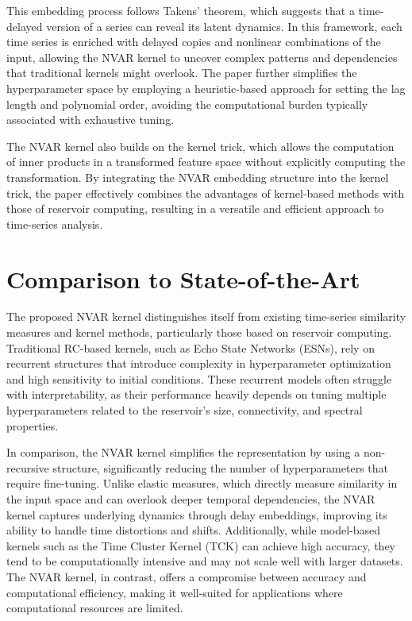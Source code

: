 This embedding process follows Takens’ theorem, which suggests that a time-delayed version of a series can reveal its latent dynamics. In this framework, each time series is enriched with delayed copies and nonlinear combinations of the input, allowing the NVAR kernel to uncover complex patterns and dependencies that traditional kernels might overlook. The paper further simplifies the hyperparameter space by employing a heuristic-based approach for setting the lag length and polynomial order, avoiding the computational burden typically associated with exhaustive tuning.

The NVAR kernel also builds on the kernel trick, which allows the computation of inner products in a transformed feature space without explicitly computing the transformation. By integrating the NVAR embedding structure into the kernel trick, the paper effectively combines the advantages of kernel-based methods with those of reservoir computing, resulting in a versatile and efficient approach to time-series analysis.

\section{Comparison to State-of-the-Art}

The proposed NVAR kernel distinguishes itself from existing time-series similarity measures and kernel methods, particularly those based on reservoir computing. Traditional RC-based kernels, such as Echo State Networks (ESNs), rely on recurrent structures that introduce complexity in hyperparameter optimization and high sensitivity to initial conditions. These recurrent models often struggle with interpretability, as their performance heavily depends on tuning multiple hyperparameters related to the reservoir’s size, connectivity, and spectral properties.

In comparison, the NVAR kernel simplifies the representation by using a non-recursive structure, significantly reducing the number of hyperparameters that require fine-tuning. Unlike elastic measures, which directly measure similarity in the input space and can overlook deeper temporal dependencies, the NVAR kernel captures underlying dynamics through delay embeddings, improving its ability to handle time distortions and shifts. Additionally, while model-based kernels such as the Time Cluster Kernel (TCK) can achieve high accuracy, they tend to be computationally intensive and may not scale well with larger datasets. The NVAR kernel, in contrast, offers a compromise between accuracy and computational efficiency, making it well-suited for applications where computational resources are limited.

